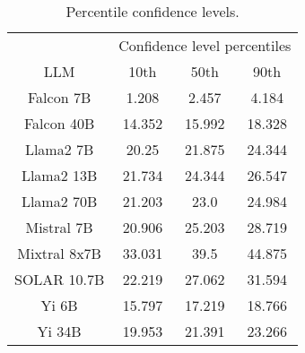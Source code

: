 \begin{table*}
\centering
\begin{tabular}{c|c|c|c}
& \multicolumn{3}{c}{Confidence level percentiles} \\ 
LLM & 10th & 50th & 90th\\ \hline
Falcon 7B & 1.208 & 2.457 & 4.184\\
Falcon 40B & 14.352 & 15.992 & 18.328\\
Llama2 7B & 20.25 & 21.875 & 24.344\\
Llama2 13B & 21.734 & 24.344 & 26.547\\
Llama2 70B & 21.203 & 23.0 & 24.984\\
Mistral 7B & 20.906 & 25.203 & 28.719\\
Mixtral 8x7B & 33.031 & 39.5 & 44.875\\
SOLAR 10.7B & 22.219 & 27.062 & 31.594\\
Yi 6B & 15.797 & 17.219 & 18.766\\
Yi 34B & 19.953 & 21.391 & 23.266\\
\hline
\end{tabular}
\caption{Percentile confidence levels.}
\label{tab:percentile_conf}
\end{table*}

